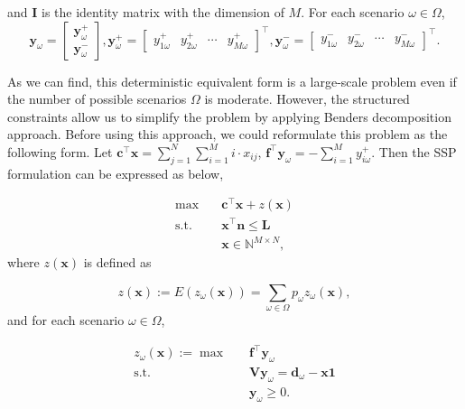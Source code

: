 and $\mathbf{I}$ is the identity matrix with the dimension of $M$. For each scenario $\omega \in \Omega$,
$$
\mathbf{y}_{\omega}=\left[\begin{array}{l}
\mathbf{y}_{\omega}^{+} \\
\mathbf{y}_{\omega}^{-}
\end{array}\right], \mathbf{y}_{\omega}^{+}=\left[\begin{array}{lllll}y_{1 \omega}^{+} & y_{2 \omega}^{+} & \cdots & y_{M \omega}^{+}\end{array}\right]^{\intercal}, \mathbf{y}_{\omega}^{-}=\left[\begin{array}{llll}y_{1 \omega}^{-} & y_{2 \omega}^{-} & \cdots & y_{M \omega}^{-}\end{array}\right]^{\intercal}.
$$

As we can find, this deterministic equivalent form is a large-scale problem even if the number of possible scenarios $\Omega$ is moderate. However, the structured constraints allow us to simplify the problem by applying Benders decomposition approach. Before using this approach, we could reformulate this problem as the following form. Let $\mathbf{c}^{\intercal}\mathbf{x} = \sum_{j =1}^{N} \sum_{i=1}^M i \cdot x_{ij}$, $\mathbf{f}^{\intercal}\mathbf{y}_{\omega} = -\sum_{i=1}^{M} y_{i \omega}^{+}$. Then the SSP formulation can be expressed as below,

\begin{equation}\label{BD_master}
\begin{aligned}
\max \quad & \mathbf{c}^{\intercal} \mathbf{x}+ z(\mathbf{x}) \\
\text {s.t.} \quad & \mathbf{x}^{\intercal} \mathbf{n}  \leq \mathbf{L} \\
& \mathbf{x} \in \mathbb{N}^{M \times N},
\end{aligned}
\end{equation}
where $z(\mathbf{x})$ is defined as

$$z(\mathbf{x}) := E(z_{\omega}(\mathbf{x})) = \sum_{\omega \in \Omega} p_{\omega} z_{\omega}(\mathbf{x}),$$ and for each scenario $\omega \in \Omega$, 

\begin{equation}\label{BD_sub}
  \begin{aligned}
    z_{\omega}(\mathbf{x}) := \max \quad & \mathbf{f}^{\intercal} \mathbf{y}_{\omega} \\
    \text {s.t.} \quad & \mathbf{V} \mathbf{y}_{\omega} = \mathbf{d}_{\omega} - \mathbf{x} \mathbf{1} \\
     & \mathbf{y}_{\omega} \geq 0.
  \end{aligned}
\end{equation}

